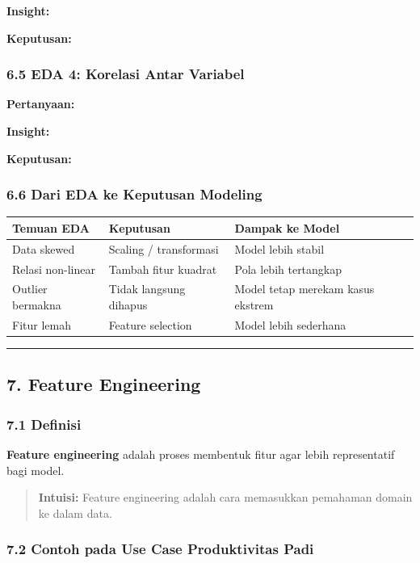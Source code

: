 \documentclass[12pt,a4paper]{article}
\begin{document}
\textbf{Insight:}


\textbf{Keputusan:}


\subsubsection{6.5 EDA 4: Korelasi Antar Variabel}

\textbf{Pertanyaan:}


\textbf{Insight:}


\textbf{Keputusan:}


\subsubsection{6.6 Dari EDA ke Keputusan Modeling}

\begin{tabular}{|l|l|l|}
\hline
Temuan EDA & Keputusan & Dampak ke Model \\
\hline
Data skewed & Scaling / transformasi & Model lebih stabil \\
\hline
Relasi non-linear & Tambah fitur kuadrat & Pola lebih tertangkap \\
\hline
Outlier bermakna & Tidak langsung dihapus & Model tetap merekam kasus ekstrem \\
\hline
Fitur lemah & Feature selection & Model lebih sederhana \\
\hline
\end{tabular}


\hrule


\subsection{7. Feature Engineering}

\subsubsection{7.1 Definisi}

\textbf{Feature engineering} adalah proses membentuk fitur agar lebih representatif bagi model.


\begin{quote}
\textbf{Intuisi:} Feature engineering adalah cara memasukkan pemahaman domain ke dalam data.\end{quote}


\subsubsection{7.2 Contoh pada Use Case Produktivitas Padi}
\end{document}
